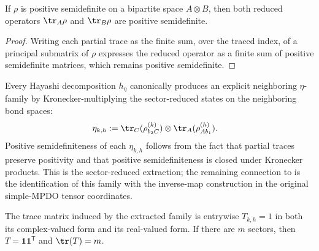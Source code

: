 \begin{lemma}
    \label{thm:matrix_possemidef_partial_traces}
    \leanok
    If $\rho$ is positive semidefinite on a bipartite space $A \otimes B$, then
    both reduced operators $\tr_A \rho$ and $\tr_B \rho$ are positive
    semidefinite.
\end{lemma}

\begin{proof}
    \leanok
    Writing each partial trace as the finite sum, over the traced index, of a
    principal submatrix of $\rho$ expresses the reduced operator as a finite
    sum of positive semidefinite matrices, which remains positive
    semidefinite.
\end{proof}

\begin{definition}
    \label{def:mpdo_eta_of_hayashi_markov}
    \leanok
    Every Hayashi decomposition $h_\eta$ canonically produces an
    explicit neighboring $\eta$-family by Kronecker-multiplying the
    sector-reduced states on the neighboring bond spaces:
    \begin{align}
        \eta_{k,h}
         & :=\tr_C(\rho_{b_2 C}^{(k)})
        \otimes \tr_A(\rho_{A b_1}^{(h)}).
        \notag
    \end{align}
    Positive semidefiniteness of each $\eta_{k,h}$ follows from the fact
    that partial traces preserve positivity and that positive
    semidefiniteness is closed under Kronecker products. This is the
    sector-reduced extraction; the remaining connection to
    \cite[Appendix~C.2]{Cirac2016MPDO_arXiv} is the identification of this
    family with the inverse-map
    construction in the original simple-MPDO tensor coordinates.
\end{definition}

\begin{lemma}
    \label{thm:mpdo_eta_of_hayashi_markov_trace_matrix}
    \leanok
    The trace matrix induced by the extracted family is entrywise
    $T_{k,h}=1$ in both its complex-valued form and its real-valued form.
    If there are $m$ sectors, then
    $T=\mathbf{1}\mathbf{1}^{\mathsf T}$ and $\tr(T)=m$.
\end{lemma}

